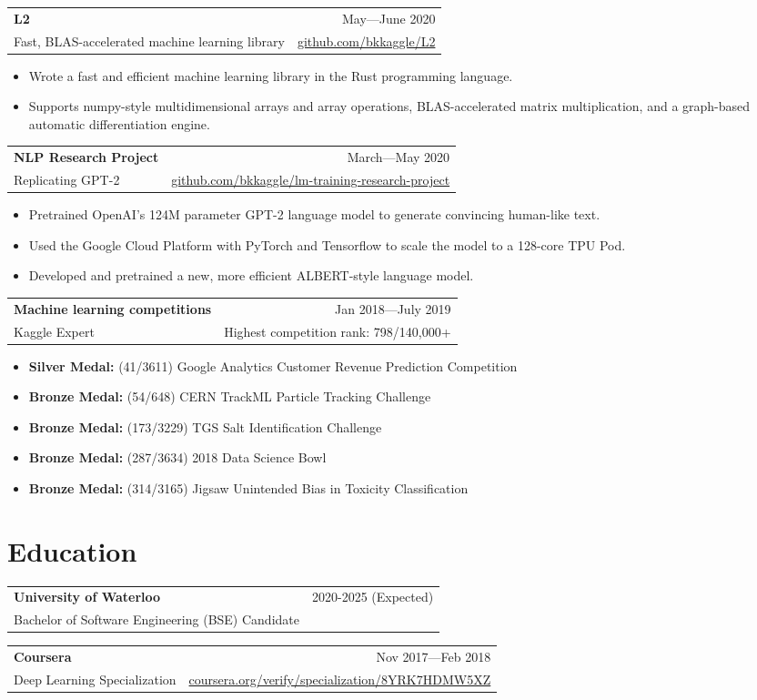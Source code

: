 \documentclass[letterpaper,11pt]{article}
\makeatletter
\newcommand{\items}[1]{
    \begin{itemize}[topsep=0pt]\itemsep0em
        #1
    \end{itemize}    
}
\newcommand{\heading}[4]{
    \begin{tabular*}{\textwidth}{l@{\extracolsep{\fill}}r}
        \large\textbf{#1} & #2\\
        #3 & #4
    \end{tabular*}
}
\makeatother
\begin{document}
    \heading{L2}{May—June 2020}{Fast, BLAS-accelerated machine learning library}{\href{https://github.com/bkkaggle/L2}{github.com/bkkaggle/L2}}
    \items{
        \item Wrote a fast and efficient machine learning library in the Rust programming language.
        \item Supports numpy-style multidimensional arrays and array operations, BLAS-accelerated matrix multiplication, and a graph-based automatic differentiation engine.
    }
    \vspace{5pt}

    \heading{NLP Research Project}{March—May 2020}{Replicating GPT-2}{\href{https://github.com/bkkaggle/lm-training-research-project}{github.com/bkkaggle/lm-training-research-project}}
    \items{
        \item Pretrained OpenAI's 124M parameter GPT-2 language model to generate convincing human-like text.
        \item Used the Google Cloud Platform with PyTorch and Tensorflow to scale the model to a 128-core TPU Pod. 
        \item Developed and pretrained a new, more efficient ALBERT-style language model.
    }
    \vspace{5pt}
    
    \heading{Machine learning competitions}{Jan 2018—July 2019}{Kaggle Expert}{Highest competition rank: 798/140,000+}
    \items{
        \item \textbf{Silver Medal:} (41/3611) Google Analytics Customer Revenue Prediction Competition
        \item \textbf{Bronze Medal:} (54/648) CERN TrackML Particle Tracking Challenge
        \item \textbf{Bronze Medal:} (173/3229) TGS Salt Identification Challenge
        \item \textbf{Bronze Medal:} (287/3634) 2018 Data Science Bowl
        \item \textbf{Bronze Medal:} (314/3165) Jigsaw Unintended Bias in Toxicity Classification
    }

\section{Education}
    \heading{University of Waterloo}{2020-2025 (Expected)}{Bachelor of Software Engineering (BSE) Candidate}{}
    \heading{Coursera}{Nov 2017—Feb 2018}{Deep Learning Specialization}{\href{https://coursera.org/verify/specialization/8YRK7HDMW5XZ}{coursera.org/verify/specialization/8YRK7HDMW5XZ}}
\end{document}
